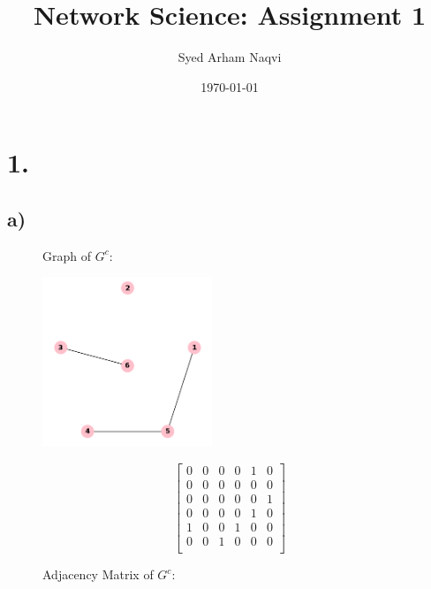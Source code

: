 \documentclass{article}
\title{Network Science: Assignment 1}
\author{Syed Arham Naqvi}
\date{\today}
\begin{document}
    \maketitle

    \section*{1.}
        \subsection*{a)}
        \begin{figure}[ht] %
            \centering
            \begin{minipage}[t]{0.5\textwidth}
                \centering
                \captionsetup{labelformat=empty} %
                \caption{Graph of $G^{c}$:}
                \includegraphics[width=2in]{Gc.png}
            \end{minipage}%
            \begin{minipage}[t]{0.5\textwidth}
                \captionsetup{labelformat=empty} %
                \caption{Adjacency Matrix of $G^{c}$:}
                \[
                \begin{bmatrix}
                    0 & 0 & 0 & 0 & 1 & 0 \\
                    0 & 0 & 0 & 0 & 0 & 0 \\
                    0 & 0 & 0 & 0 & 0 & 1 \\
                    0 & 0 & 0 & 0 & 1 & 0 \\
                    1 & 0 & 0 & 1 & 0 & 0 \\
                    0 & 0 & 1 & 0 & 0& 0 \\
                \end{bmatrix}
                \]
            \end{minipage}
        \end{figure}
\end{document}
